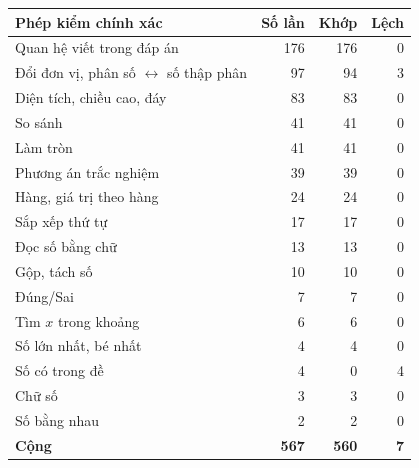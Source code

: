 \small
\begin{tabular}{@{}lrrr@{}}
\toprule
Phép kiểm chính xác & Số lần & Khớp & Lệch \\
\midrule
Quan hệ viết trong đáp án & 176 & 176 & 0 \\
Đổi đơn vị, phân số $\leftrightarrow$ số thập phân & 97 & 94 & 3 \\
Diện tích, chiều cao, đáy & 83 & 83 & 0 \\
So sánh & 41 & 41 & 0 \\
Làm tròn & 41 & 41 & 0 \\
Phương án trắc nghiệm & 39 & 39 & 0 \\
Hàng, giá trị theo hàng & 24 & 24 & 0 \\
Sắp xếp thứ tự & 17 & 17 & 0 \\
Đọc số bằng chữ & 13 & 13 & 0 \\
Gộp, tách số & 10 & 10 & 0 \\
Đúng/Sai & 7 & 7 & 0 \\
Tìm $x$ trong khoảng & 6 & 6 & 0 \\
Số lớn nhất, bé nhất & 4 & 4 & 0 \\
Số có trong đề & 4 & 0 & 4 \\
Chữ số & 3 & 3 & 0 \\
Số bằng nhau & 2 & 2 & 0 \\
\midrule
\textbf{Cộng} & \textbf{567} & \textbf{560} & \textbf{7} \\
\bottomrule
\end{tabular}
